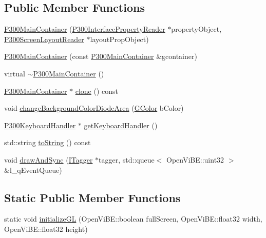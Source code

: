 \subsection*{Public Member Functions}
\begin{DoxyCompactItemize}
\item 
\hyperlink{classOpenViBEApplications_1_1P300MainContainer_a2268ed29215d50eeecf297ba8dc8fa54}{P300MainContainer} (\hyperlink{classOpenViBEApplications_1_1P300InterfacePropertyReader}{P300InterfacePropertyReader} $\ast$propertyObject, \hyperlink{classOpenViBEApplications_1_1P300ScreenLayoutReader}{P300ScreenLayoutReader} $\ast$layoutPropObject)
\item 
\hyperlink{classOpenViBEApplications_1_1P300MainContainer_aab93ee2cc5f1003ba1e6d32004417ca7}{P300MainContainer} (const \hyperlink{classOpenViBEApplications_1_1P300MainContainer}{P300MainContainer} \&gcontainer)
\item 
virtual \hyperlink{classOpenViBEApplications_1_1P300MainContainer_afea187e939b23606bf2046bdff5f412b}{$\sim$P300MainContainer} ()
\item 
\hyperlink{classOpenViBEApplications_1_1P300MainContainer}{P300MainContainer} $\ast$ \hyperlink{classOpenViBEApplications_1_1P300MainContainer_ad85e82b0d066a9ef87226d1a98e29b01}{clone} () const 
\item 
void \hyperlink{classOpenViBEApplications_1_1P300MainContainer_a2e0a6d9ef0ae9a8401eb62cff92449e2}{changeBackgroundColorDiodeArea} (\hyperlink{structOpenViBEApplications_1_1GColor}{GColor} bColor)
\item 
\hyperlink{classOpenViBEApplications_1_1P300KeyboardHandler}{P300KeyboardHandler} $\ast$ \hyperlink{classOpenViBEApplications_1_1P300MainContainer_aa69124aee2f4fc40c5fc872d7329a58e}{getKeyboardHandler} ()
\item 
std::string \hyperlink{classOpenViBEApplications_1_1P300MainContainer_adc9a6d35ed5a3e7939837561ddc2ebad}{toString} () const 
\item 
void \hyperlink{classOpenViBEApplications_1_1P300MainContainer_ac2f2c67a6b51277491d4bdd07d0d0417}{drawAndSync} (\hyperlink{classOpenViBEApplications_1_1ITagger}{ITagger} $\ast$tagger, std::queue$<$ OpenViBE::uint32 $>$ \&l\_\-qEventQueue)
\end{DoxyCompactItemize}
\subsection*{Static Public Member Functions}
\begin{DoxyCompactItemize}
\item 
static void \hyperlink{classOpenViBEApplications_1_1P300MainContainer_a4c97f1858d872bda7adb938b8a34021c}{initializeGL} (OpenViBE::boolean fullScreen, OpenViBE::float32 width, OpenViBE::float32 height)
\end{DoxyCompactItemize}
